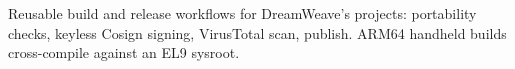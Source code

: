 \documentclass{resume}
\begin{document}
\begin{bullets}
  \item Reusable build and release workflows for DreamWeave's projects: portability checks, keyless Cosign signing, VirusTotal scan, publish. ARM64 handheld builds cross-compile against an EL9 sysroot.
\end{bullets}




\makefooter
\end{document}
